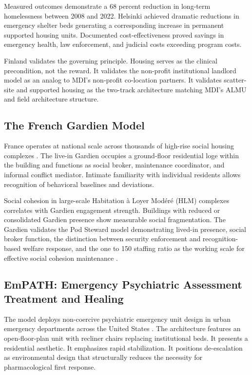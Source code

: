 \documentclass[12pt, letterpaper]{article}
\begin{document}
Measured outcomes demonstrate a 68 percent reduction in long-term homelessness between 2008 and 2022. Helsinki achieved dramatic reductions in emergency shelter beds generating a corresponding increase in permanent supported housing units. Documented cost-effectiveness proved savings in emergency health, law enforcement, and judicial costs exceeding program costs.

Finland validates the governing principle. Housing serves as the clinical precondition, not the reward. It validates the non-profit institutional landlord model as an analog to MDI's non-profit co-location partners. It validates scatter-site and supported housing as the two-track architecture matching MDI's ALMU and field architecture structure.

\subsection{The French Gardien Model}

France operates at national scale across thousands of high-rise social housing complexes \citep{harvard_gsd_gardien, tu_eindhoven_2024}. The live-in Gardien occupies a ground-floor residential loge within the building and functions as social broker, maintenance coordinator, and informal conflict mediator. Intimate familiarity with individual residents allows recognition of behavioral baselines and deviations.

Social cohesion in large-scale Habitation \`{a} Loyer Mod\'{e}r\'{e} (HLM) complexes correlates with Gardien engagement strength. Buildings with reduced or consolidated Gardien presence show measurable social fragmentation. The Gardien validates the Pod Steward model demonstrating lived-in presence, social broker function, the distinction between security enforcement and recognition-based welfare response, and the one to 150 staffing ratio as the working scale for effective social cohesion maintenance \citep{dunbar_1992}.

\subsection{EmPATH: Emergency Psychiatric Assessment Treatment and Healing}

The model deploys non-coercive psychiatric emergency unit design in urban emergency departments across the United States \citep{empath_model_2020}. The architecture features an open-floor-plan unit with recliner chairs replacing institutional beds. It presents a residential aesthetic. It emphasizes rapid stabilization. It positions de-escalation as environmental design that structurally reduces the necessity for pharmacological first response.
\end{document}
